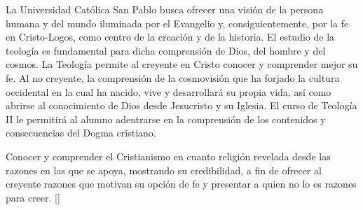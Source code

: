 \begin{syllabus}


\begin{justification}
La Universidad Católica San Pablo busca ofrecer una visión de la persona humana y del mundo iluminada por el Evangelio y, consiguientemente, por la fe en Cristo-Logos, como centro de la creación y de la historia. El estudio de la teología es fundamental para dicha comprensión de Dios, del hombre y del cosmos.
La Teología permite al creyente en Cristo conocer y comprender mejor su fe. Al no creyente, la comprensión de la cosmovisión que ha forjado la cultura occidental en la cual ha nacido, vive y desarrollará su propia vida, así como abrirse al conocimiento de Dios desde Jesucristo y su Iglesia.
El curso de Teología II le permitirá al alumno  adentrarse en la comprensión de los contenidos y consecuencias del Dogma cristiano.
\end{justification}

\begin{goals}
\item Conocer y comprender el Cristianismo en cuanto religión revelada desde las razones en las que se apoya, mostrando su credibilidad, a fin de ofrecer al creyente razones que motivan su opción de fe y presentar a quien no lo es razones para creer. [\Usage]
\end{goals}

\begin{outcomes}
    \item {}
    \item {}
    \item {}
\end{outcomes}

\begin{competences}
    \item {}
    \item {}
    \item {}
    \item {}
    \item {}
\end{competences}


\end{syllabus}
